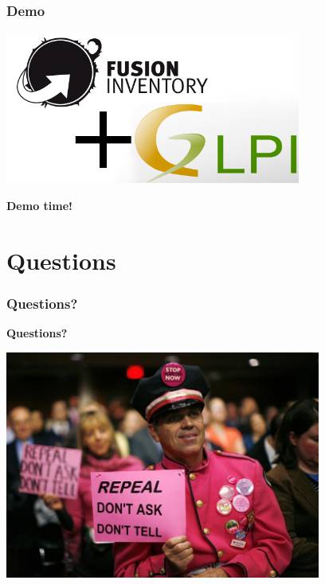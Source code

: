 \documentclass{beamer}
\begin{document}
\begin{frame}
    \frametitle{Demo}

   \includegraphics[height=5cm]{./pics/fusinvglpi.png}

    \bf{Demo time!}
\end{frame}

\section{Questions}

\begin{frame}
    \frametitle{Questions?}

    \bf{Questions?}


    \includegraphics[height=7.5cm]{./pics/ask.jpg}
    
\end{frame}
\end{document}
